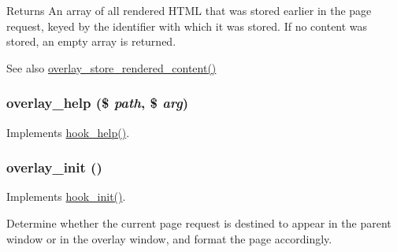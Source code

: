 \begin{DoxyReturn}{Returns}
An array of all rendered HTML that was stored earlier in the page request, keyed by the identifier with which it was stored. If no content was stored, an empty array is returned.
\end{DoxyReturn}
\begin{DoxySeeAlso}{See also}
\hyperlink{overlay_8module_a83ad6249c4b5cf10dfc5a810dec1a800}{overlay\_\-store\_\-rendered\_\-content()} 
\end{DoxySeeAlso}
\hypertarget{overlay_8module_a18127ec6257d994beff56b2fd30096f6}{
\subsubsection[{overlay\_\-help}]{\setlength{\rightskip}{0pt plus 5cm}overlay\_\-help (\$ {\em path}, \/  \$ {\em arg})}}
\label{overlay_8module_a18127ec6257d994beff56b2fd30096f6}
Implements \hyperlink{group__hooks_ga5589c2714a782738e8851c4c90231f0e}{hook\_\-help()}. \hypertarget{overlay_8module_aa31ec5e73a1837996e5e33e8b814f1fd}{
\subsubsection[{overlay\_\-init}]{\setlength{\rightskip}{0pt plus 5cm}overlay\_\-init ()}}
\label{overlay_8module_aa31ec5e73a1837996e5e33e8b814f1fd}
Implements \hyperlink{group__hooks_ga74edef0c463436fdbb1f92ef367db051}{hook\_\-init()}.

Determine whether the current page request is destined to appear in the parent window or in the overlay window, and format the page accordingly.

